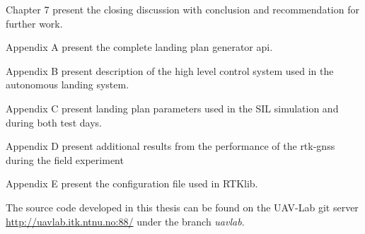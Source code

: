 Chapter 7 present the closing discussion with conclusion and recommendation for further work.

Appendix A present the complete landing plan generator \gls{api}.

Appendix B present description of the high level control system used in the autonomous landing system.

Appendix C present landing plan parameters used in the SIL simulation and during both test days.

Appendix D present additional results from the performance of the \gls{rtk-gnss} during the field experiment

Appendix E present the configuration file used in RTKlib.

The source code developed in this thesis can be found on the UAV-Lab git server \url{http://uavlab.itk.ntnu.no:88/} under the branch \textit{uavlab}.
\cleardoublepage